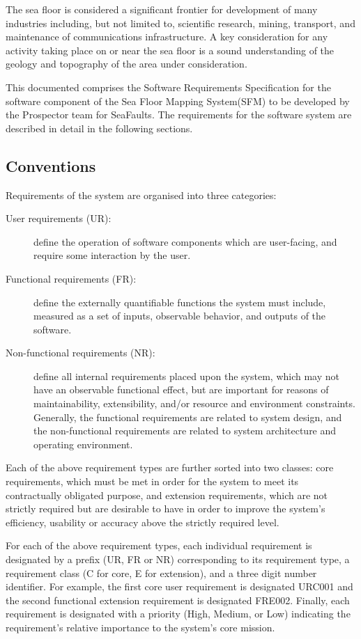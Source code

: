 \documentclass[12pt]{article}
\begin{document}
The sea floor is considered a significant frontier for development
of many industries including, but not limited to, scientific research,
mining, transport, and maintenance of communications infrastructure. A key consideration
for any activity taking place on or near the sea floor is a sound
understanding of the geology and topography of the area under consideration. 

This documented comprises the Software Requirements Specification
for the software component of the Sea Floor Mapping System(SFM) to be developed by the Prospector
team for SeaFaults. The requirements for the software system are described
in detail in the following sections.

\subsection{Conventions}

Requirements of the system are organised into three categories: 
\begin{description}
\item [{User requirements (UR):}] define the operation of software
components which are user-facing, and require some interaction by the user.
\item [{Functional requirements (FR):}] define the externally quantifiable
functions the system must include, measured as a set of inputs, observable behavior, and outputs of the software.
\item [{Non-functional requirements (NR):}] define all internal requirements
placed upon the system, which may not have an observable functional
effect, but are important for reasons of maintainability, extensibility,
and/or resource and environment constraints. Generally, the functional requirements are related to system design, and the non-functional requirements are related to system architecture and operating environment. 
\end{description}
Each of the above requirement types are further sorted into two classes: core requirements, which must be met in order for the system to meet its contractually
obligated purpose, and extension requirements, which are not strictly
required but are desirable to have in order to improve the system's
efficiency, usability or accuracy above the strictly required
level. 

For each of the above requirement types, each individual requirement
is designated by a prefix (UR, FR or NR) corresponding to its requirement
type, a requirement class (C for core, E for extension), and a three
digit number identifier. For example, the first core user requirement
is designated URC001 and the second functional extension requirement
is designated FRE002. Finally, each requirement is designated with a priority
(High, Medium, or Low) indicating the requirement's relative importance to the
system's core mission.
\end{document}
